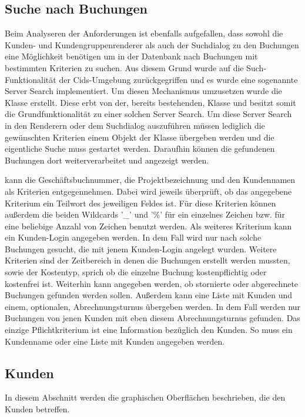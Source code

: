 \subsection{Suche nach Buchungen} \label{subsec:serversearch}
Beim Analyseren der Anforderungen ist ebenfalls aufgefallen, dass sowohl die Kunden- und Kundengruppenrenderer als auch der Suchdialog zu den Buchungen eine Möglichkeit benötigen um in der Datenbank nach Buchungen mit bestimmten Kriterien zu suchen.
Aus diesem Grund wurde auf die Such-Funktionalität der Cids-Umgebung zurückgegriffen und es wurde eine sogenannte Server Search implementiert.
Um diesen Mechanismus umzusetzen wurde die Klasse  erstellt.
Diese erbt von der, bereits bestehenden, Klasse  und besitzt somit die Grundfunktionalität zu einer solchen Server Search.
Um diese Server Search in den Renderern oder dem Suchdialog auszuführen müssen lediglich die gewünschten Kriterien einem Objekt der Klasse  übergeben werden und die eigentliche Suche muss gestartet werden.
Daraufhin können die gefundenen Buchungen dort weiterverarbeitet und angezeigt werden.

 kann die Geschäftsbuchnummer, die Projektbezeichnung und den Kundennamen als Kriterien entgegennehmen.
Dabei wird jeweils überprüft, ob das angegebene Kriterium ein Teilwort des jeweiligen Feldes ist.
Für diese Kriterien können außerdem die beiden Wildcards '\_' und '\%' für ein einzelnes Zeichen bzw. für eine beliebige Anzahl von Zeichen benutzt werden.
Als weiteres Kriterium kann ein Kunden-Login angegeben werden.
In dem Fall wird nur nach solche Buchungen gesucht, die mit jenem Kunden-Login angelegt wurden.
Weitere Kriterien sind der Zeitbereich in denen die Buchungen erstellt werden mussten, sowie der Kostentyp, sprich ob die einzelne Buchung kostenpflichtig oder kostenfrei ist.
Weiterhin kann angegeben werden, ob stornierte oder abgerechnete Buchungen gefunden werden sollen.
Außerdem kann eine Liste mit Kunden und einem, optionalen, Abrechnungsturnus übergeben werden.
In dem Fall werden nur Buchungen von jenen Kunden mit eben diesem  Abrechnungsturnus gefunden.
Das einzige Pflichtkriterium ist eine Information bezüglich den Kunden. So muss ein Kundenname oder eine Liste mit Kunden angegeben werden.

\subsection{Kunden}
In diesem Abschnitt werden die graphischen Oberflächen beschrieben, die den Kunden betreffen.
